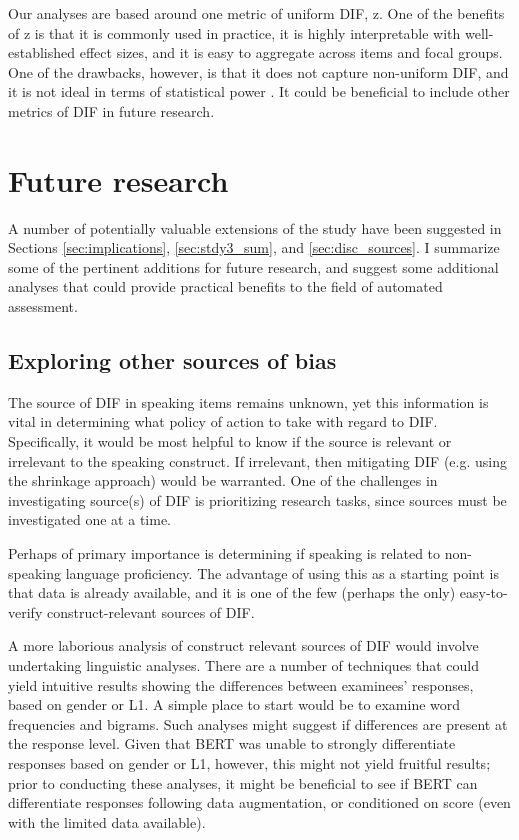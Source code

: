 \documentclass [PhD] {uclathes}
\begin{document}
Our analyses are based around one metric of uniform DIF, z. One of the benefits of z is that it is commonly used in practice, it is highly interpretable with well-established effect sizes, and it is easy to aggregate across items and focal groups. One of the drawbacks, however, is that it does not capture non-uniform DIF, and it is not ideal in terms of statistical power \citep{woods2013}. It could be beneficial to include other metrics of DIF in future research.

\section{Future research}

A number of potentially valuable extensions of the study have been suggested in Sections \ref{sec:implications}, \ref{sec:stdy3_sum}, and \ref{sec:disc_sources}. I summarize some of the pertinent additions for future research, and suggest some additional analyses that could provide practical benefits to the field of automated assessment.

\subsection{Exploring other sources of bias}

The source of DIF in speaking items remains unknown, yet this information is vital in determining what policy of action to take with regard to DIF. Specifically, it would be most helpful to know if the source is relevant or irrelevant to the speaking construct. If irrelevant, then mitigating DIF (e.g. using the shrinkage approach) would be warranted. One of the challenges in investigating source(s) of DIF is prioritizing research tasks, since sources must be investigated one at a time. 

Perhaps of primary importance is determining if speaking is related to non-speaking language proficiency. The advantage of using this as a starting point is that data is already available, and it is one of the few (perhaps the only) easy-to-verify construct-relevant sources of DIF. 

A more laborious analysis of construct relevant sources of DIF would involve undertaking linguistic analyses. There are a number of techniques that could yield intuitive results showing the differences between examinees’ responses, based on gender or L1. A simple place to start would be to examine word frequencies and bigrams. Such analyses might suggest if differences are present at the response level. Given that BERT was unable to strongly differentiate responses based on gender or L1, however, this might not yield fruitful results; prior to conducting these analyses, it might be beneficial to see if BERT can differentiate responses following data augmentation, or conditioned on score (even with the limited data available). 
\end{document}
